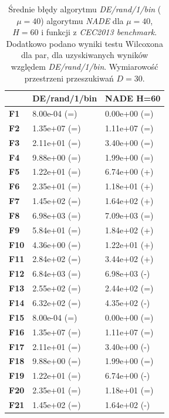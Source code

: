 \documentclass[12pt,a4paper]{report}
\begin{document}
{{{{{{{\begin{table}[h]
\centering
\caption{Średnie błędy algorytmu \emph{DE/rand/1/bin} ($\mu = 40$) algorytmu \emph{NADE} dla $\mu = 40$, $H = 60$ i funkcji z \emph{CEC2013 benchmark}. Dodatkowo podano wyniki testu Wilcoxona dla par, dla uzyskiwanych wyników względem \emph{DE/rand/1/bin}. Wymiarowość przestrzeni przeszukiwań $D = 30$.}
\label{Eksp3}
\begin{tabular}{|l|l|l|}
\hline
          & {\bf DE/rand/1/bin} & {\bf NADE H=60} \\ \hline
{\bf F1}  & 8.00e-04 (=)        & 0.00e+00 (=)    \\ \hline
{\bf F2}  & 1.35e+07 (=)        & 1.11e+07 (=)    \\ \hline
{\bf F3}  & 2.11e+01 (=)        & 3.40e+00 (=)    \\ \hline
{\bf F4}  & 9.88e+00 (=)        & 1.99e+00 (=)    \\ \hline
{\bf F5}  & 1.22e+01 (=)        & 6.74e+00 (+)    \\ \hline
{\bf F6}  & 2.35e+01 (=)        & 1.18e+01 (+)    \\ \hline
{\bf F7}  & 1.45e+02 (=)        & 1.64e+02 (+)    \\ \hline
{\bf F8}  & 6.98e+03 (=)        & 7.09e+03 (=)    \\ \hline
{\bf F9}  & 5.84e+01 (=)        & 1.84e+02 (+)    \\ \hline
{\bf F10} & 4.36e+00 (=)        & 1.22e+01 (+)    \\ \hline
{\bf F11} & 2.84e+02 (=)        & 3.44e+02 (+)    \\ \hline
{\bf F12} & 6.84e+03 (=)        & 6.98e+03 (-)    \\ \hline
{\bf F13} & 2.55e+02 (=)        & 2.44e+02 (=)    \\ \hline
{\bf F14} & 6.32e+02 (=)        & 4.35e+02 (-)    \\ \hline
{\bf F15} & 8.00e-04 (=)        & 0.00e+00 (=)    \\ \hline
{\bf F16} & 1.35e+07 (=)        & 1.11e+07 (=)    \\ \hline
{\bf F17} & 2.11e+01 (=)        & 3.40e+00 (-)    \\ \hline
{\bf F18} & 9.88e+00 (=)        & 1.99e+00 (=)    \\ \hline
{\bf F19} & 1.22e+01 (=)        & 6.74e+00 (-)    \\ \hline
{\bf F20} & 2.35e+01 (=)        & 1.18e+01 (=)    \\ \hline
{\bf F21} & 1.45e+02 (=)        & 1.64e+02 (-)    \\ \hline

\end{tabular}
\end{table}}}}}}}}
\end{document}
